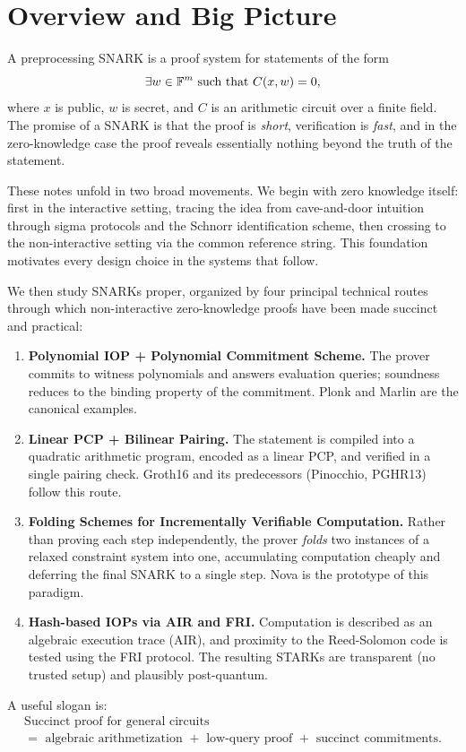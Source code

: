 \section{Overview and Big Picture}

A preprocessing SNARK is a proof system for statements of the form
\[
\exists w \in \mathbb{F}^m \text{ such that } C(x,w)=0,
\]
where $x$ is public, $w$ is secret, and $C$ is an arithmetic circuit over a finite field. The promise of a SNARK is that the proof is \emph{short}, verification is \emph{fast}, and in the zero-knowledge case the proof reveals essentially nothing beyond the truth of the statement.

These notes unfold in two broad movements. We begin with zero knowledge itself: first in the interactive setting, tracing the idea from cave-and-door intuition through sigma protocols and the Schnorr identification scheme, then crossing to the non-interactive setting via the common reference string. This foundation motivates every design choice in the systems that follow.

We then study SNARKs proper, organized by four principal technical routes through which non-interactive zero-knowledge proofs have been made succinct and practical:
\begin{enumerate}
    \item \textbf{Polynomial IOP + Polynomial Commitment Scheme.} The prover commits to witness polynomials and answers evaluation queries; soundness reduces to the binding property of the commitment. Plonk and Marlin are the canonical examples.
    \item \textbf{Linear PCP + Bilinear Pairing.} The statement is compiled into a quadratic arithmetic program, encoded as a linear PCP, and verified in a single pairing check. Groth16 and its predecessors (Pinocchio, PGHR13) follow this route.
    \item \textbf{Folding Schemes for Incrementally Verifiable Computation.} Rather than proving each step independently, the prover \emph{folds} two instances of a relaxed constraint system into one, accumulating computation cheaply and deferring the final SNARK to a single step. Nova is the prototype of this paradigm.
    \item \textbf{Hash-based IOPs via AIR and FRI.} Computation is described as an algebraic execution trace (AIR), and proximity to the Reed-Solomon code is tested using the FRI protocol. The resulting STARKs are transparent (no trusted setup) and plausibly post-quantum.
\end{enumerate}

A useful slogan is:
\[
\boxed{
\begin{array}{c}
\text{Succinct proof for general circuits}\\[0.2em]
=\text{ algebraic arithmetization }+\text{ low-query proof }+\text{ succinct commitments}.
\end{array}}
\]


